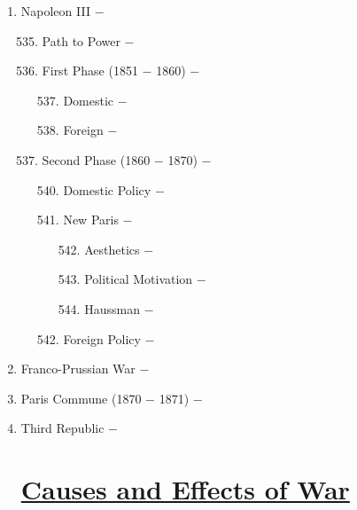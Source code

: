 \documentclass[12pt]{article}
\begin{document}
\begin{enumerate}
\item Napoleon III $-$ 
\begin{enumerate}[label=\arabic{*}.]
\setcounter{enumii}{534}

\item Path to Power $-$ 

\item First Phase (1851 $-$ 1860) $-$ 

\begin{enumerate}[label=\arabic{*}.]
\setcounter{enumiii}{536}

\item Domestic $-$ 

\item Foreign $-$ 

\end{enumerate}
\setcounter{enumii}{538}

\item Second Phase (1860 $-$ 1870) $-$

\begin{enumerate}[label=\arabic{*}.]
\setcounter{enumiii}{539}

\item Domestic Policy $-$ 

\item New Paris $-$ 

\begin{enumerate}[label=\arabic{*}.]
\setcounter{enumiv}{541}

\item Aesthetics $-$ 

\item Political Motivation $-$ 

\item Haussman $-$ 

\end{enumerate}
\setcounter{enumiii}{544}

\item Foreign Policy $-$

\end{enumerate}
\end{enumerate}
\setcounter{enumi}{545}


\item Franco-Prussian War $-$

\item Paris Commune (1870 $-$ 1871) $-$ 

\item Third Republic $-$


\section{\underline{Causes and Effects of War}}


\end{enumerate}
\end{document}
